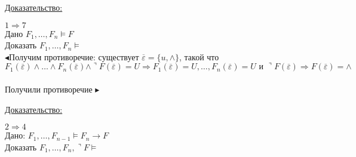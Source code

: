 \documentclass[12pt]{article}
\begin{document}
    \underline{Доказательство:}
    \begin{adjustwidth}{1.5em}{1.5em}
        $1 \Rightarrow 7$\\
        Дано $F_1,\dots,F_n \models F$\\
        Доказать $F_1,\dots, F_n \models$\\
        $\blacktriangleleft$Получим противоречие: существует $\overline{\varepsilon}=\{u,\wedge\}$, такой что \\
        \[F_1(\overline{\varepsilon}) \wedge \dots \wedge F_n(\overline{\varepsilon})\wedge \urcorner F(\overline{\varepsilon})
        = U \Rightarrow F_1(\overline{\varepsilon})=U,\dots,F_n(\overline{\varepsilon})=U \text{ и } \urcorner F(\overline{\varepsilon})
        \Rightarrow F(\overline{\varepsilon})=\wedge\] \\
        Получили противоречие $\blacktriangleright$
    \end{adjustwidth}

    \underline{Доказательство:}
    \begin{adjustwidth}{1.5em}{1.5em}
        $2 \Rightarrow 4$\\
        Дано: $F_1,\dots,F_{n-1}\models F_n \rightarrow F$\\
        Доказать $F_1,\dots,F_n,\urcorner F \models$
    \end{adjustwidth}
\end{document}
